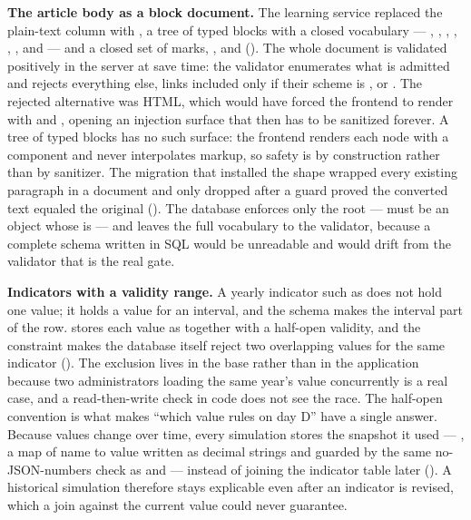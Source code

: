 \textbf{The article body as a block document.} The learning service replaced the
plain-text  column with , a
 tree of typed blocks with a closed vocabulary --- ,
, , , ,
,  and  --- and a closed set of marks,
,  and 
(). The whole document is
validated positively in the server at save time: the validator enumerates what
is admitted and rejects everything else, links included only if their scheme is
,  or . The rejected alternative was HTML,
which would have forced the frontend to render with  and
, opening an injection surface that then has to be
sanitized forever. A tree of typed blocks has no such surface: the frontend
renders each node with a component and never interpolates markup, so safety is
by construction rather than by sanitizer. The migration that installed the shape
wrapped every existing paragraph in a document and only dropped 
after a guard proved the converted text equaled the original
().
The database enforces only the root ---  must be an object whose
 is  --- and leaves the full vocabulary to the validator,
because a complete schema written in SQL would be unreadable and would drift from
the validator that is the real gate.

\textbf{Indicators with a validity range.} A yearly indicator such as 
does not hold one value; it holds a value for an interval, and the schema makes
the interval part of the row.  stores each value as
 together with a half-open  validity, and the
constraint  makes the
database itself reject two overlapping values for the same indicator
().
The exclusion lives in the base rather than in the application because two
administrators loading the same year's value concurrently is a real case, and a
read-then-write check in code does not see the race. The half-open convention is
what makes \enquote{which value rules on day D} have a single answer. Because
values change over time, every simulation stores the snapshot it used ---
, a map of name to value written as decimal strings
and guarded by the same no-JSON-numbers check as  and 
--- instead of joining the indicator table later
().
A historical simulation therefore stays explicable even after an indicator is
revised, which a join against the current value could never guarantee.

